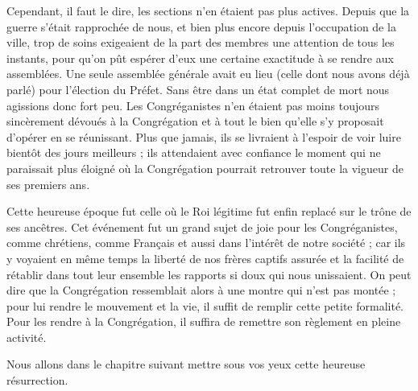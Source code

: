 Cependant, il faut le dire, les sections n'en étaient pas plus actives. Depuis que la guerre s'était rapprochée de nous, et bien plus encore depuis l'occupation de la ville, trop de soins exigeaient de la part des membres une attention de tous les instants, pour qu'on pût espérer d'eux une certaine exactitude à se rendre aux assemblées. Une seule assemblée générale avait eu lieu (celle dont nous avons
déjà parlé) pour l'élection du Préfet. Sans être dans un état complet de mort nous agissions donc fort peu. Les Congréganistes n'en étaient pas moins toujours sincèrement dévoués à la Congrégation et à tout le bien qu'elle s'y proposait d'opérer en se réunissant. Plus que jamais, ils se livraient à l'espoir de voir luire bientôt des jours meilleurs ; ils attendaient avec confiance le moment qui ne paraissait plus éloigné où la Congrégation pourrait retrouver toute la vigueur de ses premiers ans.

Cette heureuse époque fut celle où le Roi légitime fut enfin replacé sur le trône de ses ancêtres. Cet événement fut un grand sujet de joie pour les Congréganistes, comme chrétiens, comme Français et aussi dans l'intérêt de notre société ; car ils y voyaient en même temps la liberté de nos frères captifs assurée et la facilité de rétablir dans tout leur ensemble les rapports si doux qui nous unissaient. On peut dire que la Congrégation ressemblait alors à une montre qui n'est pas montée ; pour lui rendre le mouvement et la vie, il suffit de remplir cette petite formalité. Pour les rendre à la Congrégation, il suffira de remettre son règlement en pleine activité.

Nous allons dans le chapitre suivant mettre sous vos yeux cette heureuse résurrection.
